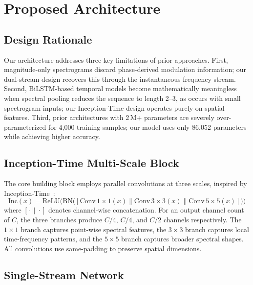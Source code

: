 \documentclass[conference]{IEEEtran}
\begin{document}
\section{Proposed Architecture}
\label{sec:arch}

\subsection{Design Rationale}

Our architecture addresses three key limitations of prior approaches. First, magnitude-only spectrograms discard phase-derived modulation information; our dual-stream design recovers this through the instantaneous frequency stream. Second, BiLSTM-based temporal models become mathematically meaningless when spectral pooling reduces the sequence to length 2--3, as occurs with small spectrogram inputs; our Inception-Time design operates purely on spatial features. Third, prior architectures with 2\,M+ parameters are severely over-parameterized for 4,000 training samples; our model uses only 86,052 parameters while achieving higher accuracy.

\subsection{Inception-Time Multi-Scale Block}

The core building block employs parallel convolutions at three scales, inspired by Inception-Time~\cite{fawaz2020inceptiontime}:
\begin{equation}\label{eq:inception}
\text{Inc}(x) = \text{ReLU}\bigl(\text{BN}\bigl([\text{Conv}\,1{\times}1(x) \| \text{Conv}\,3{\times}3(x) \| \text{Conv}\,5{\times}5(x)]\bigr)\bigr)
\end{equation}
where $[\cdot \| \cdot]$ denotes channel-wise concatenation. For an output channel count of $C$, the three branches produce $C/4$, $C/4$, and $C/2$ channels respectively. The $1{\times}1$ branch captures point-wise spectral features, the $3{\times}3$ branch captures local time-frequency patterns, and the $5{\times}5$ branch captures broader spectral shapes. All convolutions use same-padding to preserve spatial dimensions.

\subsection{Single-Stream Network}
\end{document}
